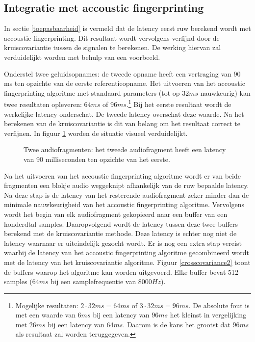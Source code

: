 \subsection{Integratie met accoustic fingerprinting}
\label{integratie-accoustic-fingerprinting}

In sectie \ref{toepasbaarheid} is vermeld dat de latency eerst ruw berekend wordt met accoustic fingerprinting. Dit resultaat wordt vervolgens verfijnd door de kruiscovariantie tussen de signalen te berekenen. De werking hiervan zal verduidelijkt worden met behulp van een voorbeeld.

Onderstel twee geluidsopnames: de tweede opname heeft een vertraging van 90 ms ten opzichte van de eerste referentieopname. Het uitvoeren van het accoustic fingerprinting algoritme met standaard parameters (tot op $ 32 ms $ nauwkeurig) kan twee resultaten opleveren: $ 64 ms $ of $ 96 ms $.\footnote{Mogelijke resultaten: $ 2 \cdot 32 ms = 64 ms$ of $ 3 \cdot 32 ms = 96 ms $. De absolute fout is  met een waarde van $ 6 ms $ bij een latency van $ 96 ms $ het kleinst in vergelijking met $ 26 ms $ bij een latency van $ 64 ms $. Daarom is de kans het grootst dat $ 96 ms $ als resultaat zal worden teruggegeven.} Bij het eerste resultaat wordt de werkelijke latency onderschat. De tweede latency overschat deze waarde. Na het berekenen van de kruiscovariantie is dit van belang om het resultaat correct te verfijnen. In figuur \ref{crosscovariance1} worden de situatie visueel verduidelijkt.

\begin{figure}[h!]
	\captionsetup{width=0.7\textwidth}
	\caption[Kruiscovariantie audiofragmenten]{Twee audiofragmenten: het tweede audiofragment heeft een latency van 90 milliseconden ten opzichte van het eerste.}
	\begin{center}
		\advance\parskip0.3cm
		
	\end{center}
	\label{crosscovariance1}
\end{figure}

Na het uitvoeren van het accoustic fingerprinting algoritme wordt er van beide fragmenten een blokje audio weggeknipt afhankelijk van de ruw bepaalde latency. Na deze stap is de latency van het resterende audiofragment zeker minder dan de minimale nauwkeurigheid van het accoustic fingerprinting algoritme. Vervolgens wordt het begin van elk audiofragment gekopieerd naar een buffer van een honderdtal samples. Daaropvolgend wordt de latency tussen deze twee buffers berekend met de kruiscovariantie methode. Deze latency is echter nog niet de latency waarnaar er uiteindelijk gezocht wordt. Er is nog een extra stap vereist waarbij de latency van het accoustic fingerprinting algoritme gecombineerd wordt met de latency van het kruiscovariantie algoritme. Figuur \ref{crosscovariance2} toont de buffers waarop het algoritme kan worden uitgevoerd. Elke buffer bevat 512 samples ($ 64 ms $ bij een samplefrequentie van $ 8000 Hz $).

